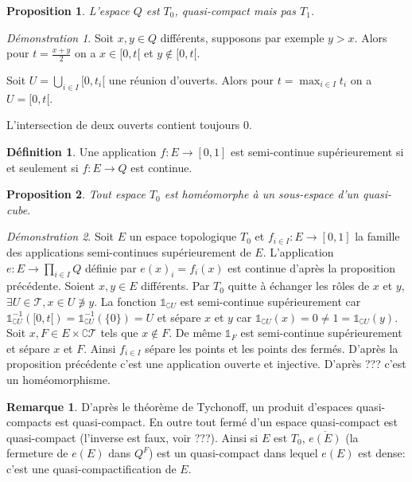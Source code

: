 \documentclass[a4paper, 11pt, french]{book}
\newenvironment{itemise}{\itemize}{\enditemize}
\theoremstyle{plain} %
\newtheorem{proposition}{Proposition}
\theoremstyle{definition} %
\newtheorem{definition}{Définition}
\newtheorem{remarque}{Remarque}
\theoremstyle{remark} %
\newtheorem*{demonstration}{Démonstration}
\newcommand{\1}{\mathds{1}}
\newcommand{\inv}[1]{#1^{-1}}
\begin{document}
\begin{proposition}
	L'espace $Q$ est $T_0$, quasi-compact mais pas $T_1$.
\end{proposition}

\begin{demonstration}
	\begin{itemise}
		\item Soit $x, y\in Q$ différents, supposons par exemple $y>x$.
		Alors pour $t=\frac{x+y}{2}$ on a $x\in[0, t[$ et $y\notin[0, t[$.
		\item Soit $U=\bigcup_{i\in I}[0, t_i[$ une réunion d'ouverts.
		Alors pour $t=\max_{i\in I}t_i$ on a $U=[0,t[$.
		\item L'intersection de deux ouverts contient toujours 0.
	\end{itemise}
\end{demonstration}

\begin{definition}
	Une application $f:E\rightarrow[0, 1]$ est semi-continue supérieurement si et seulement si $f:E\rightarrow Q$ est continue.
\end{definition}

\begin{proposition}
	Tout espace $T_0$ est homéomorphe à un sous-espace d'un quasi-cube.
\end{proposition}

\begin{demonstration}
	Soit $E$ un espace topologique $T_0$ et $f_{i\in I}:E\rightarrow [0, 1]$ la famille des applications semi-continues supérieurement de $E$.
	L'application $e:E\rightarrow \prod_{i\in I}Q$ définie par $e(x)_i=f_i(x)$ est continue d'après la proposition précédente.
	Soient $x, y\in E$ différents.
	Par $T_0$ quitte à échanger les rôles de $x$ et $y$, $\exists U\in\mathscr{T}, x\in U\not\ni y$.
	La fonction $\1_{\complement U}$ est semi-continue supérieurement car $\inv{\1_{\complement U}}([0, t[)=\inv{\1_{\complement U}}(\{0\})=U$ et sépare $x$ et $y$ car $\1_{\complement U}(x)=0\neq1=\1_{\complement U}(y)$.
	Soit $x, F\in E\times\complement\mathscr{T}$ tels que $x\notin F$.
	De même $\1_F$ est semi-continue supérieurement et sépare $x$ et $F$.
	Ainsi $f_{i\in I}$ sépare les points et les points des fermés.
	D'après la proposition précédente c'est une application ouverte et injective.
	D'après {\color{red} ???} c'est un homéomorphisme.
\end{demonstration}

\begin{remarque}
	D'après le théorème de Tychonoff, un produit d'espaces quasi-compacts est quasi-compact.
	En outre tout fermé d'un espace quasi-compact  est quasi-compact (l'inverse est faux, voir {\color{red} ???}).
	Ainsi si $E$ est $T_0$, $\overline{e(E)}$ (la fermeture de $e(E)$ dans $Q^F$) est un quasi-compact dans lequel $e(E)$ est dense: c'est une quasi-compactification de $E$.
\end{remarque}
\end{document}
